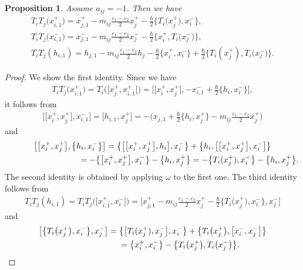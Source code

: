 \documentclass[11pt]{article}
\newtheorem{prop}[thm]{Proposition}
\theoremstyle{definition}
\numberwithin{equation}{section}
\newcommand{\ve}{\varepsilon}
\begin{document}
\begin{prop}\label{prop:iji}Assume $a_{ij}=-1$. Then we have
\begin{gather*}
T_i T_j \big(x_{i,1}^+\big) = x_{j,1}^+ - m_{ij}\tfrac{\ve_1 - \ve_2}{2}x_j^+ - \tfrac{\hbar}{2}\big\{T_i\big(x_j^+\big),x_i^-\big\}, \\
T_i T_j \big(x_{i,1}^-\big) = x_{j,1}^- - m_{ij}\tfrac{\ve_1 - \ve_2}{2}x_j^- - \tfrac{\hbar}{2}\big\{x_i^+,T_i\big(x_j^-\big)\big\}, \\
T_i T_j (h_{i,1}) = h_{j,1} - m_{ij}\tfrac{\ve_1 - \ve_2}{2}h_j - \tfrac{\hbar}{2}\{x_i^+,x_i^-\} + \tfrac{\hbar}{2}\big\{T_i(x_j^+),T_i\big(x_j^-\big)\big\}.
\end{gather*}
\end{prop}
\begin{proof}We show the first identity. Since we have
\begin{gather*}
T_iT_j\big(x_{i,1}^+\big) = T_i\big(\big[x_{j}^+,x_{i,1}^+\big]\big) = \big[\big[x_i^+,x_j^+\big],-x_{i,1}^-+\tfrac{\hbar}{2}\big\{h_i,x_i^{-}\big\}\big],
\end{gather*}
it follows from
\begin{gather*}
\big[\big[x_i^+,x_j^+\big],x_{i,1}^-\big] = \big[h_{i,1},x_j^+\big] = -\big( x_{j,1} + \tfrac{\hbar}{2}\big\{h_i,x_j^{+}\big\} - m_{ij} \tfrac{\ve_1 - \ve_2}{2}x_j^+ \big)
\end{gather*}
and
\begin{gather*}
\big[\big[x_i^+,x_j^+\big],\big\{h_i,x_i^{-}\big\}\big]= \big\{\big[\big[x_i^+,x_j^+\big],h_i\big],x_i^-\big\} + \big\{h_i,\big[\big[x_i^+,x_j^+\big],x_i^-\big]\big\} \\
 \hphantom{\big[\big[x_i^+,x_j^+\big],\big\{h_i,x_i^{-}\big\}\big]}{} = -\big\{\big[x_i^+,x_j^+\big],x_i^-\big\} - \big\{h_i,x_j^{+}\big\} = -\big\{T_i(x_j^+),x_i^-\big\} - \big\{h_i,x_j^{+}\big\}.
\end{gather*}
The second identity is obtained by applying $\omega$ to the first one. The third identity follows from
\begin{gather*}
T_iT_j(h_{i,1})= T_iT_j\big(\big[x_{i,1}^+,x_{i}^-\big]\big) = \big[x_{j,1}^+-m_{ij}\tfrac{\ve_1-\ve_2}{2}x_j^+-\tfrac{\hbar}{2}\big\{T_i\big(x_j^+\big),x_i^-\big\},x_j^-\big]
\end{gather*}
and
\begin{gather*}
\big[\big\{T_i\big(x_j^+\big),x_i^-\big\},x_j^-\big] = \big\{\big[T_i(x_j^+),x_j^-\big],x_i^-\big\} + \big\{T_i\big(x_j^+\big),\big[x_i^-,x_j^-\big]\big\}\\
\hphantom{\big[\big\{T_i\big(x_j^+\big),x_i^-\big\},x_j^-\big]}{} = \big\{x_i^+,x_i^-\big\} - \big\{T_i\big(x_j^+\big),T_i\big(x_j^-\big)\big\}.\tag*{\qed}
\end{gather*}\renewcommand{\qed}{}
\end{proof}
\end{document}
